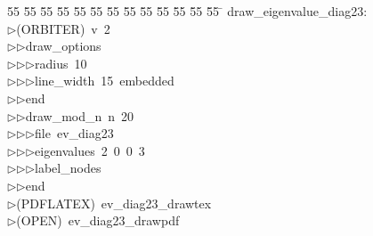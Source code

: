 %
%
\begin{tabbing}
55 \= 55 \= 55 \= 55 \= 55 \= 55 \= 55 \= 55 \= 55 \= 55 \= 55 \= 55 \= 55 \= \kill
draw\_eigenvalue\_diag23:\\[0pt]
$\triangleright$\>(ORBITER)\ v\ 2\ \\[0pt]
$\triangleright$\>$\triangleright$\>draw\_options\ \\[0pt]
$\triangleright$\>$\triangleright$\>$\triangleright$\>radius\ 10\ \\[0pt]
$\triangleright$\>$\triangleright$\>$\triangleright$\>line\_width\ 15\ embedded\ \\[0pt]
$\triangleright$\>$\triangleright$\>end\ \\[0pt]
$\triangleright$\>$\triangleright$\>draw\_mod\_n\ n\ 20\ \\[0pt]
$\triangleright$\>$\triangleright$\>$\triangleright$\>file\ ev\_diag23\ \\[0pt]
$\triangleright$\>$\triangleright$\>$\triangleright$\>eigenvalues\ 2\ 0\ 0\ 3\ \\[0pt]
$\triangleright$\>$\triangleright$\>$\triangleright$\>label\_nodes\ \\[0pt]
$\triangleright$\>$\triangleright$\>end\\[0pt]
$\triangleright$\>(PDFLATEX)\ ev\_diag23\_drawtex\\[0pt]
$\triangleright$\>(OPEN)\ ev\_diag23\_drawpdf\\[0pt]
\end{tabbing}
